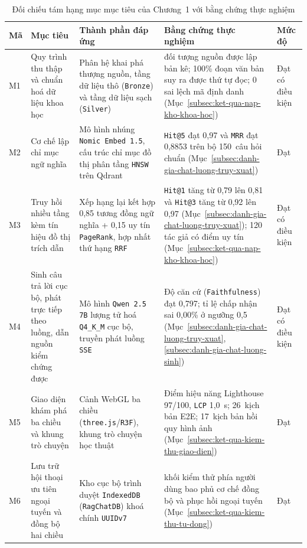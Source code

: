 \begin{table}[htbp]
\centering
\caption{Đối chiếu tám hạng mục mục tiêu của Chương~1 với bằng chứng thực nghiệm}
\label{tab:doi-chieu-muc-tieu-ch1}
\footnotesize
\setlength{\tabcolsep}{4pt}
\begin{tabularx}{\textwidth}{
  >{\raggedright\arraybackslash}p{0.8cm}
  >{\raggedright\arraybackslash}p{3.0cm}
  >{\raggedright\arraybackslash}p{3.4cm}
  >{\raggedright\arraybackslash}X
  >{\raggedright\arraybackslash}p{2.1cm}
}
\toprule
\textbf{Mã} & \textbf{Mục tiêu} & \textbf{Thành phần đáp ứng} & \textbf{Bằng chứng thực nghiệm} & \textbf{Mức độ} \\
\midrule
M1 & Quy trình thu thập và chuẩn hoá dữ liệu khoa học & Phân hệ khai phá thượng nguồn, tầng dữ liệu thô (\texttt{Bronze}) và tầng dữ liệu sạch (\texttt{Silver}) & 136.823 đối tượng nguồn được lập bản kê; 100\% đoạn văn bản suy ra được thứ tự đọc; 0 sai lệch mã định danh (Mục~\ref{subsec:ket-qua-nap-kho-khoa-hoc}) & Đạt có điều kiện \\
\midrule
M2 & Cơ chế lập chỉ mục ngữ nghĩa & Mô hình nhúng \texttt{Nomic Embed 1.5}, cấu trúc chỉ mục đồ thị phân tầng \texttt{HNSW} trên Qdrant & \texttt{Hit@5} đạt 0,97 và \texttt{MRR} đạt 0,8853 trên bộ 150~câu hỏi chuẩn (Mục~\ref{subsec:danh-gia-chat-luong-truy-xuat}) & Đạt \\
\midrule
M3 & Truy hồi nhiều tầng kèm tín hiệu đồ thị trích dẫn & Xếp hạng lại kết hợp 0,85 tương đồng ngữ nghĩa + 0,15 uy tín \texttt{PageRank}, hợp nhất thứ hạng \texttt{RRF} & \texttt{Hit@1} tăng từ 0,79 lên 0,81 và \texttt{Hit@3} tăng từ 0,92 lên 0,97 (Mục~\ref{subsec:danh-gia-chat-luong-truy-xuat}); 120 tác giả có điểm uy tín (Mục~\ref{subsec:ket-qua-nap-kho-khoa-hoc}) & Đạt có điều kiện \\
\midrule
M4 & Sinh câu trả lời cục bộ, phát trực tiếp theo luồng, dẫn nguồn kiểm chứng được & Mô hình \texttt{Qwen 2.5 7B} lượng tử hoá \texttt{Q4\_K\_M} cục bộ, truyền phát luồng \texttt{SSE} & Độ căn cứ (\texttt{Faithfulness}) đạt 0,797; tỉ lệ chấp nhận sai 0,00\% ở ngưỡng 0,5 (Mục~\ref{subsec:danh-gia-chat-luong-truy-xuat}, \ref{subsec:danh-gia-chat-luong-sinh}) & Đạt có điều kiện \\
\midrule
M5 & Giao diện khám phá ba chiều và khung trò chuyện & Cảnh WebGL ba chiều (\texttt{three.js}/\texttt{R3F}), khung trò chuyện học thuật & Điểm hiệu năng Lighthouse 97/100, \texttt{LCP} 1,0~s; 26~kịch bản E2E; 17~kịch bản hồi quy hình ảnh (Mục~\ref{subsec:ket-qua-kiem-thu-giao-dien}) & Đạt \\
\midrule
M6 & Lưu trữ hội thoại ưu tiên ngoại tuyến và đồng bộ hai chiều & Kho cục bộ trình duyệt \texttt{IndexedDB} (\texttt{RagChatDB}) khoá chính \texttt{UUIDv7} & 327 khối kiểm thử phía người dùng bao phủ cơ chế đồng bộ và phục hồi ngoại tuyến (Mục~\ref{subsec:ket-qua-kiem-thu-tu-dong}) & Đạt \\

\end{tabularx}
\end{table}
